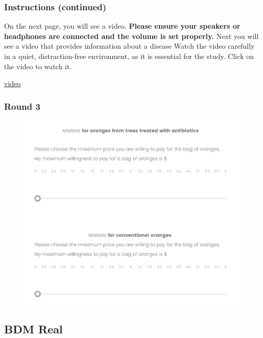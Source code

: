 \documentclass[12pt]{article}
\begin{document}
{\clearpage

\subsubsection*{\textbf{Instructions (continued)}}
On the next page, you will see a video. \textbf{Please ensure your speakers or headphones are connected and the volume is set properly.} Next you will see a video that provides information about a disease Watch the video carefully in a quiet, distraction-free environment, as it is essential for the study.
\vspace{0.5cm}
Click on the video to watch it.

\href{https://www.youtube.com/watch?v=_AqMBjB0ChM}{video}
\clearpage


 \subsubsection*{\centering Round 3}


\begin{figure}[H]
    \centering
    \includegraphics[width=\linewidth]{BDM_market.jpg}
    \caption{}
    \label{fig:BDM_market}
\end{figure}

\clearpage



\subsection{BDM Real}


}
\end{document}
